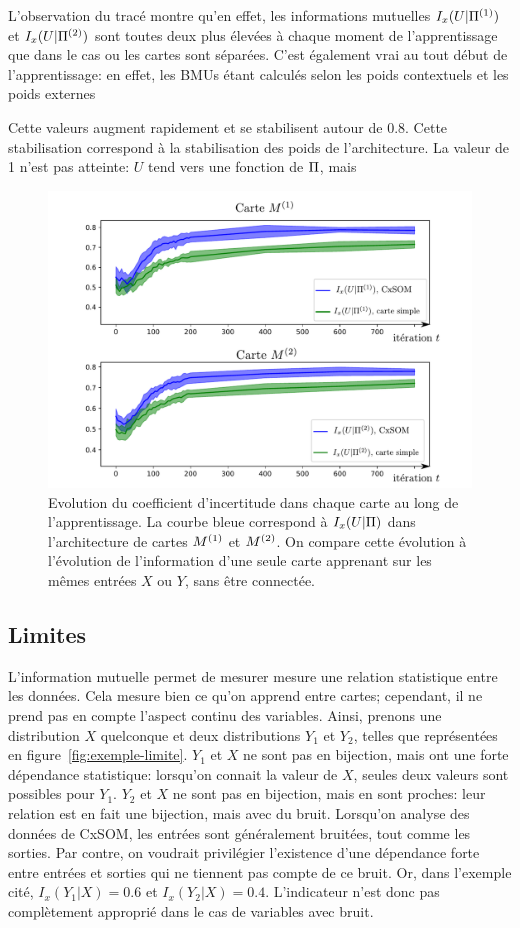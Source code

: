L'observation du tracé montre qu'en effet, les informations mutuelles $I_x(U|\Pi^{({1})})$ et $I_x(U|\Pi^{({2})})$ sont toutes deux plus élevées à chaque moment de l'apprentissage que dans le cas ou les cartes sont séparées. C'est également vrai au tout début de l'apprentissage: en effet, les BMUs étant calculés selon les poids contextuels et les poids externes

Cette valeurs augment rapidement et se stabilisent autour de 0.8. Cette stabilisation correspond à la stabilisation des poids de l'architecture. La valeur de 1 n'est pas atteinte: $U$ tend vers une fonction de $\Pi$, mais 

\begin{figure}
\includegraphics[width=\textwidth]{evolution_MI_binning}
\caption{Evolution du coefficient d'incertitude dans chaque carte au long de l'apprentissage. La courbe bleue correspond à $I_x(U|\Pi)$ dans l'architecture de cartes $M^{({1})}$ et $M^{({2})}$. On compare cette évolution à l'évolution de l'information d'une seule carte apprenant sur les mêmes entrées $X$ ou $Y$, sans être connectée.}
\label{fig:MI_evol}
\end{figure}



\subsection{Limites}
L'information mutuelle permet de mesurer mesure une relation statistique entre les données. Cela mesure bien ce qu'on apprend entre cartes; cependant, il ne prend pas en compte l'aspect continu des variables. Ainsi, prenons une distribution $X$ quelconque et deux distributions $Y_1$ et $Y_2$, telles que représentées en figure~\ref{fig:exemple-limite}. $Y_1$ et $X$ ne sont pas en bijection, mais ont une forte dépendance statistique: lorsqu'on connait la valeur de $X$, seules deux valeurs sont possibles pour $Y_1$.
$Y_2$ et $X$ ne sont pas en bijection, mais en sont proches: leur relation est en fait une bijection, mais avec du bruit. Lorsqu'on analyse des données de CxSOM, les entrées sont généralement bruitées, tout comme les sorties. Par contre, on voudrait privilégier l'existence d'une dépendance forte entre entrées et sorties qui ne tiennent pas compte de ce bruit. Or, dans l'exemple cité, $I_x(Y_1|X) = 0.6$ et $I_x(Y_2|X) = 0.4$. L'indicateur n'est donc pas complètement approprié dans le cas de variables avec bruit.

